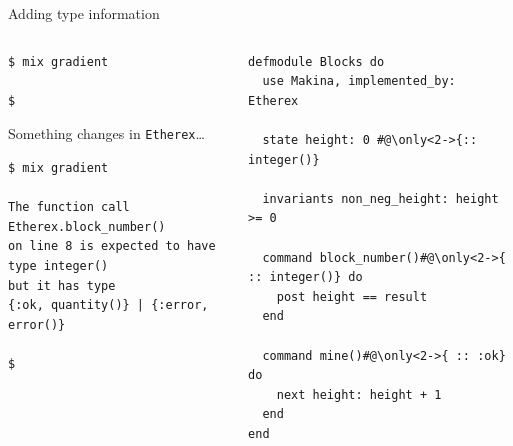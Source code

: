\documentclass[aspectratio=169, 10pt, handout]{beamer}
\begin{document}
\begin{frame}[label={sec:orgfadc7cb},fragile]{Adding type information}
 \begin{columns}
\begin{column}{0.48\columnwidth}
\lstset{language=bash,label= ,caption= ,captionpos=b,numbers=none,style=shell}
\begin{lstlisting}
$ mix gradient

$
\end{lstlisting}

\vspace{10pt}
Something changes in \texttt{Etherex}\ldots{}

\vspace{10pt}

\lstset{language=bash,label= ,caption= ,captionpos=b,numbers=none,style=shell}
\begin{lstlisting}
$ mix gradient

The function call Etherex.block_number()
on line 8 is expected to have type integer()
but it has type
{:ok, quantity()} | {:error, error()}

$
\end{lstlisting}
\end{column}

\begin{column}{0.48\columnwidth}
\lstset{language=elixir,label= ,caption= ,captionpos=b,numbers=none,style=display, numbers=left}
\begin{lstlisting}
defmodule Blocks do
  use Makina, implemented_by: Etherex

  state height: 0 #@\only<2->{:: integer()}

  invariants non_neg_height: height >= 0

  command block_number()#@\only<2->{ :: integer()} do
    post height == result
  end

  command mine()#@\only<2->{ :: :ok} do
    next height: height + 1
  end
end
\end{lstlisting}
\end{column}
\end{columns}
\end{frame}
\end{document}
